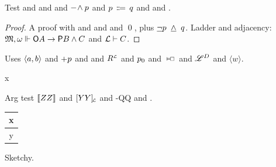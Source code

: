 \documentclass{article}
\begin{document}
\begin{theorem}
  Test \Cax and \CMr and \cmr and $\deland p$ and $p \defby q$ and \Kfour and \rup.
\end{theorem}
\begin{proof}
  A proof with \mprule and \close and \infr and \qed, plus $\mathord{\underline{\lnot}} p \;\mathrel{\underline{\land}}\; q$.
  Ladder and adjacency: $\mathfrak{M},\omega\Vdash\mathsf{{O}} A\rightarrow\mathsf{{P}} B\land C$ and $\mathcal{L}\vdash C$.
\end{proof}
\begin{definition}
  Uses $\langle a,b \rangle$ and $\af p$ and \EN and $R^{{\scriptscriptstyle\mathcal{L}}}$ and ${p_0}$ and $\cnecs$ and $\mathscr{L}^{D}$
  and $\langle w\rangle$.
\end{definition}
\begin{hilbertlist}
  \item x 
\end{hilbertlist}
Arg test $\llbracket ZZ\rrbracket$ and $[YY]_{{\mkern-3mu\scriptscriptstyle \mathcal{L}}}$ and \hyp{QQ} and .
\begin{tabular}{c}\toprule x\\ \midrule y\\ \bottomrule\end{tabular}
\begin{proofsketch}
  Sketchy.
\end{proofsketch}
\cite{ckA} \cite[p.~5]{ckB}  
  \textcite{ckG} 
\end{document}

